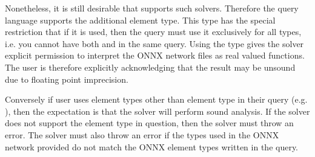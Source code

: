 Nonetheless, it is still desirable that \vnnlib{} supports such solvers. Therefore the \vnnlib{} query language supports the additional  element type. This type has the special restriction that if it is used, then the query must use it exclusively for all types, i.e. you cannot have both  and  in the same query.
Using the  type gives the solver explicit permission to interpret the ONNX network files as real valued functions. The user is therefore explicitly acknowledging that the result may be unsound due to floating point imprecision. 

Conversely if user uses element types other than  element type in their query (e.g. ), then the expectation is that the solver will perform sound analysis. If the solver does not support the element type in question, then the solver must throw an error. The solver must also throw an error if the types used in the ONNX network provided do not match the ONNX element types written in the query.

